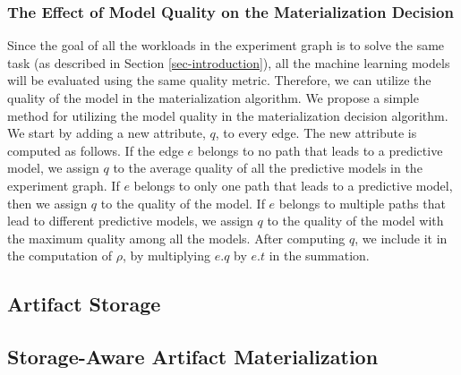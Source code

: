 \subsubsection{The Effect of Model Quality on the Materialization Decision}
Since the goal of all the workloads in the experiment graph is to solve the same task (as described in Section \ref{sec-introduction}), all the machine learning models will be evaluated using the same quality metric.
Therefore, we can utilize the quality of the model in the materialization algorithm.
We propose a simple method for utilizing the model quality in the materialization decision algorithm.
We start by adding a new attribute, $q$, to every edge.
The new attribute is computed as follows.
If the edge $e$ belongs to no path that leads to a predictive model, we assign $q$ to the average quality of all the predictive models in the experiment graph.
If $e$ belongs to only one path that leads to a predictive model, then we assign $q$ to the quality of the model.
If $e$ belongs to multiple paths that lead to different predictive models, we assign $q$ to the quality of the model with the maximum quality among all the models.
After computing $q$, we include it in the computation of $\rho$, by multiplying $e.q$ by $e.t$ in the summation. 

\subsection{Artifact Storage}

\subsection{Storage-Aware Artifact Materialization}
